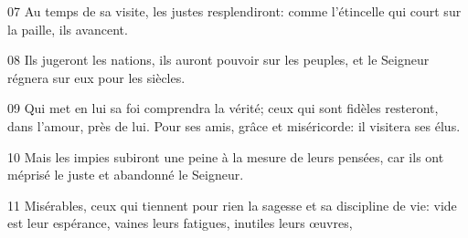 
07 Au temps de sa visite, les justes resplendiront: comme l’étincelle qui court sur la paille, ils avancent.

08 Ils jugeront les nations, ils auront pouvoir sur les peuples, et le Seigneur régnera sur eux pour les siècles.

09 Qui met en lui sa foi comprendra la vérité; ceux qui sont fidèles resteront, dans l’amour, près de lui. Pour ses amis, grâce et miséricorde: il visitera ses élus.

10 Mais les impies subiront une peine à la mesure de leurs pensées, car ils ont méprisé le juste et abandonné le Seigneur.

11 Misérables, ceux qui tiennent pour rien la sagesse et sa discipline de vie: vide est leur espérance, vaines leurs fatigues, inutiles leurs œuvres,